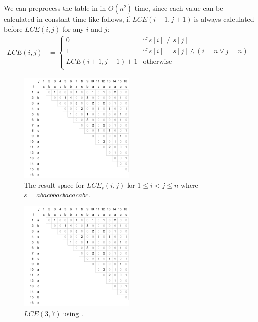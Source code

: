 \documentclass[a4]{article}
\begin{document}
We can preprocess the table in in $O(n^2)$ time, since each value can be calculated in constant time like follows, if $LCE(i+1,j+1)$ is always calculated before $LCE(i,j)$ for any $i$ and $j$:
\begin{align*}
LCE(i,j) &=
\begin{cases}
    0 & \textrm{if} ~ s[i] \neq s[j] \\
    1 & \textrm{if} ~ s[i] = s[j] \wedge (i = n \lor j = n) \\
    LCE(i+1, j+1) + 1 & \textrm{otherwise} \\
\end{cases}
\end{align*}

\begin{figure}[tp]
    \begin{center}
        \includegraphics[width=0.5\textwidth,page=1]{resultspace.pdf}
    \end{center}
    \caption{\label{fig:resultspace-empty}The result space for $LCE_s(i,j)$ for $1 \leq i < j \leq n$ where $s = abacbbacbacacabc$.}
\end{figure}

\begin{figure}[tp]
    \begin{center}
        \includegraphics[width=0.5\textwidth,page=2]{resultspace.pdf}
    \end{center}
    \caption{\label{fig:resultspace-directcomp}$LCE(3,7)$ using .}
\end{figure}
\end{document}
